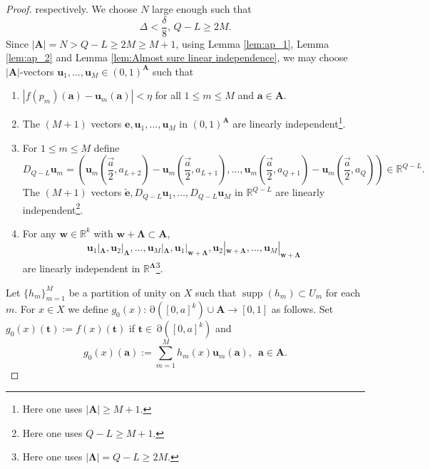 \documentclass[11pt]{article}
\theoremstyle{plain}
\theoremstyle{definition}
\DeclareMathOperator{\Edge}{\partial}
\DeclareMathOperator{\supp}{supp}
\def\Rk{\mathbb{R}^k}
\def\tt{\mathbf t}
\def\aa{\mathbf a}
\def\AA{\mathbf A}
\def\LL{\mathbf \Lambda}
\numberwithin{figure}{section}
\begin{document}
\begin{proof}
    respectively. We choose $N$ large enough such that
    \begin{equation} \label{eq:Delta}
        \Delta<\frac{\delta}{8},\,Q-L\geq 2M.
    \end{equation}
      Since $|\mathbf{A}|=N> Q-L\geq 2M\geq M+1$,
    using Lemma \ref{lem:ap_1}, Lemma \ref{lem:ap_2} and Lemma \ref{lem:Almost sure linear independence}, we may choose $|\mathbf{A}|$-vectors
        $\mathbf u_1,\ldots,\mathbf u_M\in (0,1)^{\mathbf{A}}$
    such that
    \begin{enumerate}[$(1)$]
    \item  $|f(p_m)(\aa)-\mathbf u_m(\aa)|<\eta$ for all $1\leq m\leq M$ and $\aa\in \AA$.
    \item The $(M+1)$ vectors $\mathbf e,\mathbf u_1,\ldots,\mathbf u_M$ in $(0,1)
    ^{\mathbf{A}}$ are linearly independent\footnote{Here one uses $|\AA|\geq M+1$.}. 
     \item  
     For $1\leq m\leq M$ define 
     \begin{equation}\label{eq:D_QL}
    D_{Q-L}\mathbf u_m=(\mathbf u_m(\vec{\frac{a}{2}},a_{L+2})-\mathbf u_m(\vec{\frac{a}{2}},a_{L+1}),\ldots,\mathbf u_m(\vec{\frac{a}{2}},a_{Q+1})-\mathbf u_m(\vec{\frac{a}{2}},a_Q))\in\mathbb{R}^{Q-L}.     
     \end{equation}
         The $(M+1)$ vectors $\widetilde{\mathbf e},D_{Q-L} \mathbf u_1,\ldots,D_{Q-L}\mathbf u_M$ in $\mathbb{R}^{Q-L}$ are linearly independent\footnote{Here one uses $Q-L\geq M+1$.}.
    \item  For any $\mathbf w\in\Rk$ with $\mathbf w+\LL\subset \mathbf{A}$, 
    \begin{equation*}
        \mathbf u_1|_{\LL},\mathbf u_2|_{\LL},\ldots,\mathbf u_M|_{\LL},\mathbf u_1|_{\mathbf w+\LL},\mathbf u_2|_{\mathbf w+\LL},\ldots,\mathbf u_M|_{\mathbf w+\LL}
    \end{equation*}
    are linearly independent in $\mathbb{R}^{\LL}$\footnote{Here one uses $|\LL|=Q-L\geq  2M$.}.
    \end{enumerate}
 Let $\{h_m\}_{m=1}^{M}$ be a partition of unity on $X$ such that $\supp(h_m)\subset U_m$ for each $m$. 
        For $x\in X$ we define $g_0(x):\Edge([0,a]^k)\cup\mathbf{A}\to[0,1]$ as follows.     
        Set $g_0(x)(\tt):=f(x)(\tt)$ if $\mathbf t\in\Edge([0,a]^k)$ and 
        \begin{equation}\label{eq:g_0 on A}
            g_0(x)(\mathbf a):=\sum\limits_{m=1}^{M}h_{m}(x)\mathbf u_m(\mathbf a),\,\,\,\aa \in \AA .
        \end{equation}

\end{proof}
\end{document}

